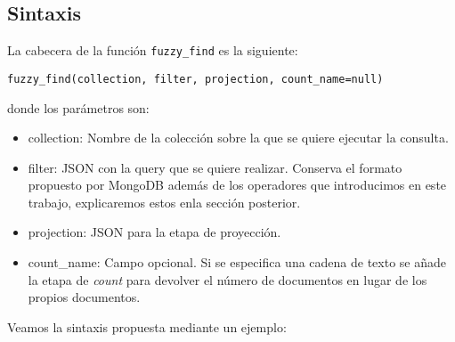 \subsection{Sintaxis}

La cabecera de la función \texttt{fuzzy\_find} es la siguiente:

\begin{lstlisting}[numbers=none]
fuzzy_find(collection, filter, projection, count_name=null)
\end{lstlisting}

donde los parámetros son:

\begin{itemize}
    \item collection: Nombre de la colección sobre la que se quiere ejecutar la consulta.
    \item filter: JSON con la query que se quiere realizar. Conserva el formato propuesto por MongoDB además de los operadores que introducimos en este trabajo, explicaremos estos enla sección posterior.
    \item projection: JSON para la etapa de proyección.
    \item count\_name: Campo opcional. Si se especifica una cadena de texto se añade la etapa de \textit{count} para devolver el número de documentos en lugar de los propios documentos.
\end{itemize}

Veamos la sintaxis propuesta mediante un ejemplo:

